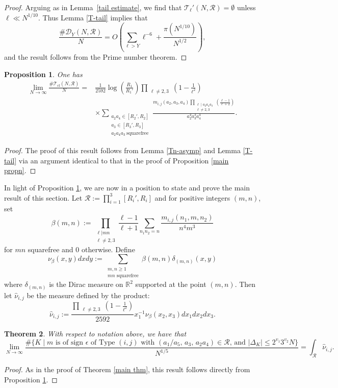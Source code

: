 \documentclass[table]{amsart}
\newtheorem{theorem}{Theorem}[section]
\newtheorem{proposition}[theorem]{Proposition}
\newcommand{\op}[1]{\operatorname{#1}}
\numberwithin{equation}{section}
\begin{document}
\begin{proof}
Arguing as in Lemma~\ref{tail estimate}, we find that $\mathcal{T}_\ell'(N,\mathscr{R})=\emptyset$ unless $\ell\ll N^{1/10}$. Thus Lemma \ref{T-tail} implies that \[\frac{\# \mathcal{D}_Y(N,\mathscr{R})}{N}=O\left(\sum_{\ell>Y} \ell^{-6}+ \frac{\pi(N^{1/10})}{N^{1/2}}\right),\]
    and the result follows from the Prime number theorem.
\end{proof}

\begin{proposition}\label{T-main}
One has
\[
\begin{split}
\lim_{N\to\infty}
\frac{\#\mathcal{T}_{\op{cf}}(N,\mathscr{R})}{N}
=&
\frac{1}{2592}
\log\!\left(\frac{R_1}{R_1'}\right)
\prod_{\substack{\ell\neq 2,3}}
\left(1-\frac{1}{\ell^2}\right) \\
&\times
\sum_{\substack{a_2a_4\in[R_2',R_2]\\
a_3\in[R_3',R_3]\\
a_2a_4a_3\ \mathrm{squarefree}}}
\frac{m_{i,j}(a_2,a_3,a_4)
\prod_{\substack{\ell\mid a_2a_4a_3\\ \ell\neq 2,3}}
\left(\frac{\ell-1}{\ell+2}\right)}
{a_2^4 a_3^3 a_4^4}.
\end{split}
\]
\end{proposition}
\begin{proof}
    The proof of this result follows from Lemma \ref{Tn-asymp} and Lemma \ref{T-tail} via an argument identical to that in the proof of Proposition \ref{main propn}. 
\end{proof}

\par In light of Proposition \ref{T-main}, we are now in a position to state and prove the main result of this section. Let $\mathscr{R}:=\prod_{i=1}^3 [R_i', R_i]$ and for positive integers $(m,n)$, set \[\beta(m, n):=\prod_{\substack{\ell|mn\\\ell\neq 2,3}} \frac{\ell-1}{\ell+1} \sum_{n_1 n_2=n} \frac{m_{i,j}(n_1, m,n_2)}{n^4m^3}\] for $mn$ squarefree and $0$ otherwise. Define \[\nu_\beta(x,y)dxdy:=\sum_{\substack{m, n\geq 1\\ mn \text{ squarefree}}} \beta(m,n)\delta_{(m,n)}(x,y)\]
where $\delta_{(m,n)}$ is the Dirac measure on $\mathbb{R}^2$ supported at the point $(m,n)$. Then let $\hat{\nu}_{i,j}$ be the measure defined by the product:
\begin{equation}\label{nu i, j defn}\hat{\nu}_{i,j}:=\frac{\prod_{\substack{\ell\neq 2,3}}\left(1-\frac{1}{\ell^2}\right)}{2592}x_1^{-1}\nu_\beta(x_2,x_3) dx_1dx_2dx_3.\end{equation}

\begin{theorem}\label{main thm 2}
    With respect to notation above, we have that 
    \[\lim_{N\rightarrow \infty} \frac{\#\{K\mid m\text{ is of sign }\epsilon \text{ of Type }(i,j)\text{ with }(a_1/a_5,\, a_3,\, a_2a_4)\in \mathscr{R}\text{, and }|\Delta_K|\leq 2^{v_1}3^{v_2}N\}}{N^{1/5}}=\int_{\mathscr{R}} \hat{\nu}_{i,j}.\]
\end{theorem}
\begin{proof}
    As in the proof of Theorem \ref{main thm}, this result follows directly from Proposition \ref{T-main}.
\end{proof}


\end{document}
